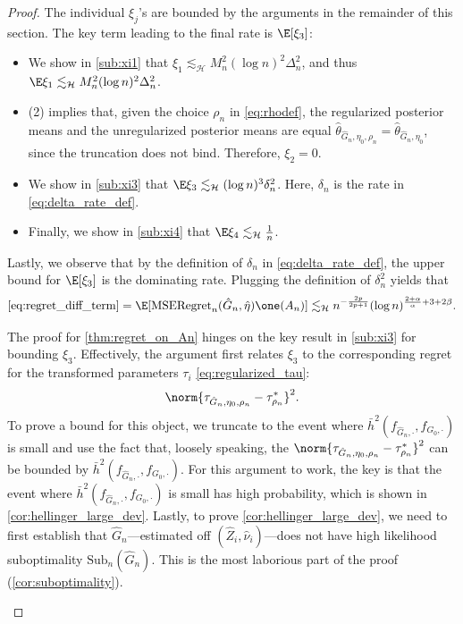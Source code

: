 \documentclass[12pt, reqno]{amsart}
\newcommand{\fs}[1]{f_{#1, \boldsymbol{\cdot}}}
\newcommand{\barh}{\bar h}
\newcommand{\leH}{\lesssim_{\mathcal{H}}}
\newcommand{\hateta}{\hat\eta}
\newcommand{\reg}{\mathrm{MSERegret}_n}
\newcommand{\sub}{\mathrm{Sub}}
\numberwithin{equation}{section}
\begin{document}
\begin{refsection}
\begin{appendices}
\begin{proof}
The individual $\xi_j$'s are bounded by the arguments in the remainder of this
section. The key term leading to the final rate is $\E[\xi_3]$:
\begin{itemize}[wide]
  \item We show in \cref{sub:xi1} that $\xi_1 \leH M_n^2 (\log n)^2 \Delta_n^2$, and thus $\E \xi_1 \leH M_n^2 (\log n)^2
\Delta_n^2$. 
\item {}(2) implies that, given the choice $\rho_n$ in \eqref{eq:rhodef}, the
regularized posterior means and the unregularized posterior means are equal $\hat\theta_
{\hat G_n,
\eta_0, \rho_n} = \hat\theta_{\hat G_n,
\eta_0}$, since the truncation does not bind. Therefore, $\xi_2 = 0$.

\item We show in \cref{sub:xi3} that $\E\xi_3 \leH
(\log n)^3 \delta_n^2$. Here, $\delta_n$ is the rate in \eqref{eq:delta_rate_def}.

\item Finally, we show in \cref{sub:xi4} that $\E\xi_4 \leH 
\frac{1}{n}$. 
\end{itemize}


Lastly, we observe that by the definition of $\delta_n$ in \eqref{eq:delta_rate_def}, the
upper bound for $\E[\xi_3]$ is the dominating rate. Plugging the definition of
$\delta_n^2$ yields that \[
\eqref{eq:regret_diff_term} = \E[\reg(\hat G_n,\hateta)\one(A_n)] \leH n^{-\frac{2p}{2p+1}} (\log n)^{\frac{2 + \alpha}{\alpha} +
 3 + 2\beta}.
\qedhere
\]

\begin{rmksq}
The proof for \cref{thm:regret_on_An} hinges on the key result in \cref{sub:xi3} for
bounding $\xi_3$. Effectively, the argument first relates $\xi_3$ to the corresponding
regret for the transformed parameters $\tau_i$ \eqref{eq:regularized_tau}: \[
\norm{\tau_{\hat G_n, \eta_0, \rho_n} - \tau_{\rho_n}^*}^2. 
\]
To prove a bound for this object, we truncate to the event where $\barh^2(\fs{\hat
G_n}, \fs{G_0})$ is small and use the fact that, loosely speaking, the $\norm{\tau_{\hat
G_n, \eta_0, \rho_n}
- \tau_{\rho_n}^*}^2$ can be bounded by $\barh^2(\fs{\hat G_n}, \fs
   {G_0})$. For this argument to work, the key is that the event where
   $\barh^2(\fs{\hat G_n}, \fs{G_0})$ is small has high probability, which is
   shown in 
\cref{cor:hellinger_large_dev}. Lastly, to prove \cref{cor:hellinger_large_dev}, we need
to first establish that $\hat G_n$---estimated off $(\hat Z_i, \hat\nu_i)$---does not have
high likelihood suboptimality $\sub_n(\hat G_n)$. This is the most laborious part of the
proof (\cref{cor:suboptimality}). 
\end{rmksq}





\end{proof}
\end{appendices}
\end{refsection}
\end{document}
